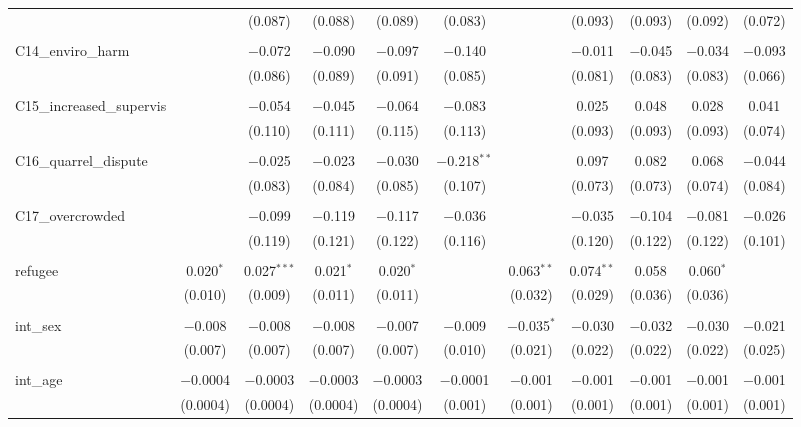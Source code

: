 \begin{table}[H]
\begin{tabular}{@{\extracolsep{4pt}}lcccccccccc}
  &  & (0.087) & (0.088) & (0.089) & (0.083) &  & (0.093) & (0.093) & (0.092) & (0.072) \\ 
  & & & & & & & & & & \\ 
 C14\_enviro\_harm &  & $-$0.072 & $-$0.090 & $-$0.097 & $-$0.140 &  & $-$0.011 & $-$0.045 & $-$0.034 & $-$0.093 \\ 
  &  & (0.086) & (0.089) & (0.091) & (0.085) &  & (0.081) & (0.083) & (0.083) & (0.066) \\ 
  & & & & & & & & & & \\ 
 C15\_increased\_supervis &  & $-$0.054 & $-$0.045 & $-$0.064 & $-$0.083 &  & 0.025 & 0.048 & 0.028 & 0.041 \\ 
  &  & (0.110) & (0.111) & (0.115) & (0.113) &  & (0.093) & (0.093) & (0.093) & (0.074) \\ 
  & & & & & & & & & & \\ 
 C16\_quarrel\_dispute &  & $-$0.025 & $-$0.023 & $-$0.030 & $-$0.218$^{**}$ &  & 0.097 & 0.082 & 0.068 & $-$0.044 \\ 
  &  & (0.083) & (0.084) & (0.085) & (0.107) &  & (0.073) & (0.073) & (0.074) & (0.084) \\ 
  & & & & & & & & & & \\ 
 C17\_overcrowded &  & $-$0.099 & $-$0.119 & $-$0.117 & $-$0.036 &  & $-$0.035 & $-$0.104 & $-$0.081 & $-$0.026 \\ 
  &  & (0.119) & (0.121) & (0.122) & (0.116) &  & (0.120) & (0.122) & (0.122) & (0.101) \\ 
  & & & & & & & & & & \\ 
 refugee & 0.020$^{*}$ & 0.027$^{***}$ & 0.021$^{*}$ & 0.020$^{*}$ &  & 0.063$^{**}$ & 0.074$^{**}$ & 0.058 & 0.060$^{*}$ &  \\ 
  & (0.010) & (0.009) & (0.011) & (0.011) &  & (0.032) & (0.029) & (0.036) & (0.036) &  \\ 
  & & & & & & & & & & \\ 
 int\_sex & $-$0.008 & $-$0.008 & $-$0.008 & $-$0.007 & $-$0.009 & $-$0.035$^{*}$ & $-$0.030 & $-$0.032 & $-$0.030 & $-$0.021 \\ 
  & (0.007) & (0.007) & (0.007) & (0.007) & (0.010) & (0.021) & (0.022) & (0.022) & (0.022) & (0.025) \\ 
  & & & & & & & & & & \\ 
 int\_age & $-$0.0004 & $-$0.0003 & $-$0.0003 & $-$0.0003 & $-$0.0001 & $-$0.001 & $-$0.001 & $-$0.001 & $-$0.001 & $-$0.001 \\ 
  & (0.0004) & (0.0004) & (0.0004) & (0.0004) & (0.001) & (0.001) & (0.001) & (0.001) & (0.001) & (0.001) \\ 

\end{tabular}
\end{table}
